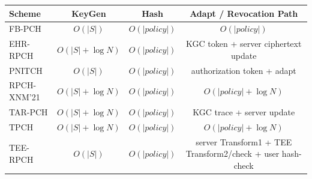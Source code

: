 \begin{tabular}{lccc}
\toprule
\textbf{Scheme} & \textbf{KeyGen} & \textbf{Hash} & \textbf{Adapt / Revocation Path} \\
\midrule
FB-PCH & $O(|S|)$ & $O(|policy|)$ & $O(|policy|)$ \\
EHR-RPCH & $O(|S|+\log N)$ & $O(|policy|)$ & KGC token + server ciphertext update \\
PNITCH & $O(|S|)$ & $O(|policy|)$ & authorization token + adapt \\
RPCH-XNM'21 & $O(|S|+\log N)$ & $O(|policy|)$ & $O(|policy|+\log N)$ \\
TAR-PCH & $O(|S|+\log N)$ & $O(|policy|)$ & KGC trace + server update \\
TPCH & $O(|S|+\log N)$ & $O(|policy|)$ & $O(|policy|+\log N)$ \\
TEE-RPCH & $O(|S|)$ & $O(|policy|)$ & server Transform1 + TEE Transform2/check + user hash-check \\
\bottomrule
\end{tabular}
